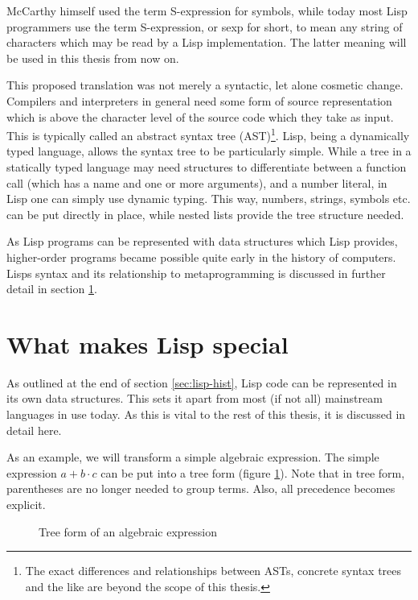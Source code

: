 \documentclass[a4paper,10pt,twoside]{article}
\begin{document}
McCarthy himself used the term S-expression for symbols, while today most Lisp
programmers use the term S-expression, or sexp for short, to mean any string of
characters which may be read by a Lisp implementation.  The latter meaning will
be used in this thesis from now on.

This proposed translation was not merely a syntactic, let alone cosmetic change.
Compilers and interpreters in general need some form of source representation
which is above the character level of the source code which they take as input.
This is typically called an abstract syntax tree (AST)\footnote{The exact
  differences and relationships between ASTs, concrete syntax trees and the like
  are beyond the scope of this thesis.}.  Lisp, being a dynamically typed
language, allows the syntax tree to be particularly simple.  While a tree in a
statically typed language may need structures to differentiate between a
function call (which has a name and one or more arguments), and a number
literal, in Lisp one can simply use dynamic typing.  This way, numbers, strings,
symbols etc. can be put directly in place, while nested lists provide the tree
structure needed.

As Lisp programs can be represented with data structures which Lisp provides,
higher-order programs became possible quite early in the history of computers.
Lisps syntax and its relationship to metaprogramming is discussed in further
detail in section \ref{sec:lisp-special}.

\section{What makes Lisp special}
\label{sec:lisp-special}

As outlined at the end of section \ref{sec:lisp-hist}, Lisp code can be
represented in its own data structures.  This sets it apart from most (if not
all) mainstream languages in use today. As this is vital to the rest of this
thesis, it is discussed in detail here.

As an example, we will transform a simple algebraic expression.  The simple
expression \(a + b \cdot c\) can be put into a tree form (figure
\ref{fig:simple-tree}).  Note that in tree form, parentheses are no longer
needed to group terms.  Also, all precedence becomes explicit.

\begin{figure}[h]
  \centering
  
  \caption{Tree form of an algebraic expression}
  \label{fig:simple-tree}
\end{figure}
\end{document}
